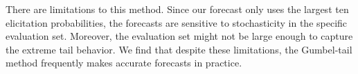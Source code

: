 There are limitations to this method. Since our forecast only uses the largest ten elicitation probabilities, the forecasts are sensitive to stochasticity in the specific evaluation set. Moreover, the evaluation set might not be large enough to capture the extreme tail behavior. 
We find that despite these limitations, the Gumbel-tail method frequently makes accurate forecasts in practice. 
